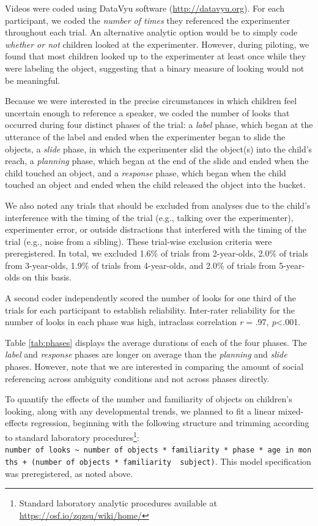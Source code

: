 \documentclass[a4paper,man,apacite,floatsintext]{apa6}
\begin{document}
Videos were coded using DataVyu software (\url{http://datavyu.org}). For
each participant, we coded the \emph{number of times} they referenced
the experimenter throughout each trial. An alternative analytic option
would be to simply code \emph{whether or not} children looked at the
experimenter. However, during piloting, we found that most children
looked up to the experimenter at least once while they were labeling the
object, suggesting that a binary measure of looking would not be
meaningful.

Because we were interested in the precise circumstances in which
children feel uncertain enough to reference a speaker, we coded the
number of looks that occurred during four distinct phases of the trial:
a \emph{label} phase, which began at the utterance of the label and
ended when the experimenter began to slide the objects, a \emph{slide}
phase, in which the experimenter slid the object(s) into the child's
reach, a \emph{planning} phase, which began at the end of the slide and
ended when the child touched an object, and a \emph{response} phase,
which began when the child touched an object and ended when the child
released the object into the bucket.

We also noted any trials that should be excluded from analyses due to
the child's interference with the timing of the trial (e.g., talking
over the experimenter), experimenter error, or outside distractions that
interfered with the timing of the trial (e.g., noise from a sibling).
These trial-wise exclusion criteria were preregistered. In total, we
excluded 1.6\% of trials from 2-year-olds, 2.0\% of trials from
3-year-olds, 1.9\% of trials from 4-year-olds, and 2.0\% of trials from
5-year-olds on this basis.

A second coder independently scored the number of looks for one third of
the trials for each participant to establish reliability. Inter-rater
reliability for the number of looks in each phase was high, intraclass
correlation \emph{r} = .97, \emph{p}\textless{}.001.

Table \ref{tab:phases} displays the average durations of each of the
four phases. The \emph{label} and \emph{response} phases are longer on
average than the \emph{planning} and \emph{slide} phases. However, note
that we are interested in comparing the amount of social referencing
across ambiguity conditions and not across phases directly.

To quantify the effects of the number and familiarity of objects on
children's looking, along with any developmental trends, we planned to
fit a linear mixed-effects regression, beginning with the following
structure and trimming according to standard laboratory
procedures\footnote{Standard laboratory analytic procedures available at
  \url{https://osf.io/zqzsu/wiki/home/}}:
\texttt{number\ of\ looks\ \textasciitilde{}\ number\ of\ objects\ *\ familiarity\ *\ phase\ *\ age\ in\ months\ +\ (number\ of\ objects\ *\ familiarity\ \textbar{}\ subject)}.
This model specification was preregistered, as noted above.
\end{document}
